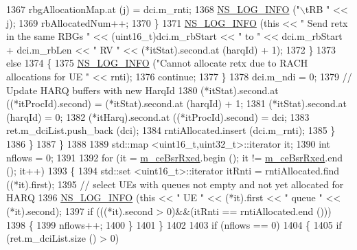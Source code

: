 \begin{DoxyCode}
1367                       rbgAllocationMap.at (j) = dci.m\_rnti;
1368                       \hyperlink{group__logging_gafbd73ee2cf9f26b319f49086d8e860fb}{NS\_LOG\_INFO} (\textcolor{stringliteral}{"\(\backslash\)tRB "} << j);
1369                       rbAllocatedNum++;
1370                     \}
1371                   \hyperlink{group__logging_gafbd73ee2cf9f26b319f49086d8e860fb}{NS\_LOG\_INFO} (\textcolor{keyword}{this} << \textcolor{stringliteral}{" Send retx in the same RBGs "} << (uint16\_t)dci.m\_rbStart
       << \textcolor{stringliteral}{" to "} << dci.m\_rbStart + dci.m\_rbLen << \textcolor{stringliteral}{" RV "} << (*itStat).second.at (harqId) + 1);
1372                 \}
1373               \textcolor{keywordflow}{else}
1374                 \{
1375                   \hyperlink{group__logging_gafbd73ee2cf9f26b319f49086d8e860fb}{NS\_LOG\_INFO} (\textcolor{stringliteral}{"Cannot allocate retx due to RACH allocations for UE "} << rnti);
1376                   \textcolor{keywordflow}{continue};
1377                 \}
1378               dci.m\_ndi = 0;
1379               \textcolor{comment}{// Update HARQ buffers with new HarqId}
1380               (*itStat).second.at ((*itProcId).second) = (*itStat).second.at (harqId) + 1;
1381               (*itStat).second.at (harqId) = 0;
1382               (*itHarq).second.at ((*itProcId).second) = dci;
1383               ret.m\_dciList.push\_back (dci);
1384               rntiAllocated.insert (dci.m\_rnti);
1385             \}
1386         \}
1387     \}
1388 
1389   std::map <uint16\_t,uint32\_t>::iterator it;
1390   \textcolor{keywordtype}{int} nflows = 0;
1391 
1392   \textcolor{keywordflow}{for} (it = \hyperlink{classns3_1_1RrFfMacScheduler_a1696bc07e1fdc0336106223f97b44298}{m\_ceBsrRxed}.begin (); it != \hyperlink{classns3_1_1RrFfMacScheduler_a1696bc07e1fdc0336106223f97b44298}{m\_ceBsrRxed}.end (); it++)
1393     \{
1394       std::set <uint16\_t>::iterator itRnti = rntiAllocated.find ((*it).first);
1395       \textcolor{comment}{// select UEs with queues not empty and not yet allocated for HARQ}
1396       \hyperlink{group__logging_gafbd73ee2cf9f26b319f49086d8e860fb}{NS\_LOG\_INFO} (\textcolor{keyword}{this} << \textcolor{stringliteral}{" UE "} << (*it).first << \textcolor{stringliteral}{" queue "} << (*it).second);
1397       \textcolor{keywordflow}{if} (((*it).second > 0)&&(itRnti == rntiAllocated.end ()))
1398         \{
1399           nflows++;
1400         \}
1401     \}
1402 
1403   \textcolor{keywordflow}{if} (nflows == 0)
1404     \{
1405       \textcolor{keywordflow}{if} (ret.m\_dciList.size () > 0)

\end{DoxyCode}
